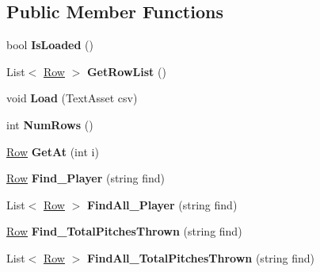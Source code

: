 \subsection*{Public Member Functions}
\begin{DoxyCompactItemize}
\item 
bool {\bfseries Is\+Loaded} ()\hypertarget{class_stats_script_a05e095a7b6ceb2cb162097eb8ca057f7}{}\label{class_stats_script_a05e095a7b6ceb2cb162097eb8ca057f7}

\item 
List$<$ \hyperlink{class_stats_script_1_1_row}{Row} $>$ {\bfseries Get\+Row\+List} ()\hypertarget{class_stats_script_ab694271f69930e2ca60d661191b6de0a}{}\label{class_stats_script_ab694271f69930e2ca60d661191b6de0a}

\item 
void {\bfseries Load} (Text\+Asset csv)\hypertarget{class_stats_script_abbb542941d6e9bfecd959003f0415efb}{}\label{class_stats_script_abbb542941d6e9bfecd959003f0415efb}

\item 
int {\bfseries Num\+Rows} ()\hypertarget{class_stats_script_a5af68d30e1221feaada21af2c6302ab4}{}\label{class_stats_script_a5af68d30e1221feaada21af2c6302ab4}

\item 
\hyperlink{class_stats_script_1_1_row}{Row} {\bfseries Get\+At} (int i)\hypertarget{class_stats_script_af304a59da1a5b36c06600a2ed0e7632d}{}\label{class_stats_script_af304a59da1a5b36c06600a2ed0e7632d}

\item 
\hyperlink{class_stats_script_1_1_row}{Row} {\bfseries Find\+\_\+\+Player} (string find)\hypertarget{class_stats_script_adb52699d72e21fbf672290e3398ea8f3}{}\label{class_stats_script_adb52699d72e21fbf672290e3398ea8f3}

\item 
List$<$ \hyperlink{class_stats_script_1_1_row}{Row} $>$ {\bfseries Find\+All\+\_\+\+Player} (string find)\hypertarget{class_stats_script_a66b3728e33f67d2dd51fd62f1c88e5c2}{}\label{class_stats_script_a66b3728e33f67d2dd51fd62f1c88e5c2}

\item 
\hyperlink{class_stats_script_1_1_row}{Row} {\bfseries Find\+\_\+\+Total\+Pitches\+Thrown} (string find)\hypertarget{class_stats_script_afec28fb6a7f3524d6586431b8814d27b}{}\label{class_stats_script_afec28fb6a7f3524d6586431b8814d27b}

\item 
List$<$ \hyperlink{class_stats_script_1_1_row}{Row} $>$ {\bfseries Find\+All\+\_\+\+Total\+Pitches\+Thrown} (string find)\hypertarget{class_stats_script_a09df979ef9ecaf0223986e9dfd6ddddf}{}\label{class_stats_script_a09df979ef9ecaf0223986e9dfd6ddddf}


\end{DoxyCompactItemize}

